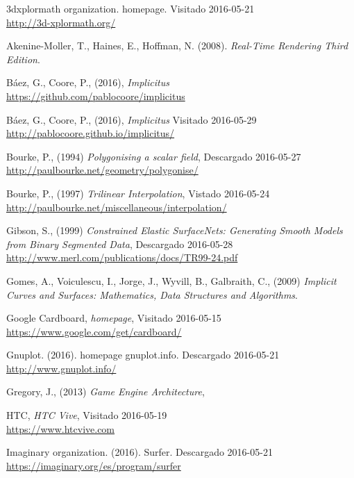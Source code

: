 \documentclass[12pt]{article}
\begin{document}
\begin{thebibliography}{9}

3dxplormath organization. homepage. 
Visitado 2016-05-21 
\\\url{http://3d-xplormath.org/}

Akenine-Moller, T., Haines, E., Hoffman, N. (2008). \textit{Real-Time Rendering Third Edition}.

Báez, G., Coore, P., (2016), \textit{Implicitus}
\\\url{https://github.com/pablocoore/implicitus}

Báez, G., Coore, P., (2016), \textit{Implicitus}
Visitado 2016-05-29 
\\\url{http://pablocoore.github.io/implicitus/}

Bourke, P., (1994) \textit{Polygonising a scalar field},
Descargado 2016-05-27 
\\\url{http://paulbourke.net/geometry/polygonise/}

Bourke, P., (1997) \textit{Trilinear Interpolation},
Vistado 2016-05-24 
\\\url{http://paulbourke.net/miscellaneous/interpolation/}

Gibson, S., (1999) \textit{Constrained Elastic SurfaceNets: Generating Smooth Models from Binary Segmented Data},
Descargado 2016-05-28 
\\\url{http://www.merl.com/publications/docs/TR99-24.pdf}

Gomes, A., Voiculescu, I., Jorge, J., Wyvill, B., Galbraith, C., (2009) \textit{Implicit Curves and Surfaces: Mathematics, Data Structures and Algorithms}. 

Google Cardboard, \textit{homepage},
Visitado 2016-05-15 
\\\url{https://www.google.com/get/cardboard/}

Gnuplot. (2016). homepage gnuplot.info. 
Descargado 2016-05-21 
\\\url{http://www.gnuplot.info/}

Gregory, J., (2013) \textit{Game Engine Architecture},

HTC, \textit{HTC Vive},
Visitado 2016-05-19 
\\\url{https://www.htcvive.com}

Imaginary organization. (2016). Surfer. 
Descargado 2016-05-21 
\\\url{https://imaginary.org/es/program/surfer}


\end{thebibliography}
\end{document}
